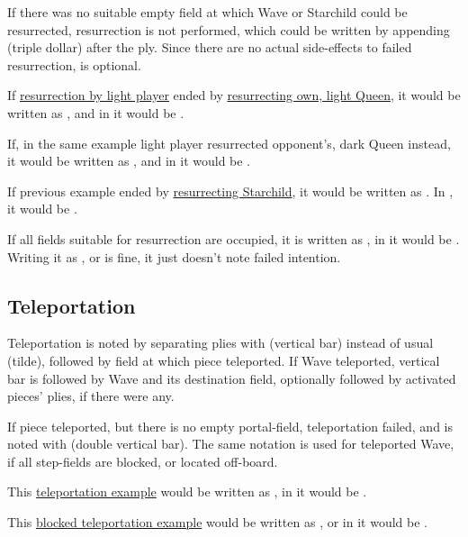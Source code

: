 If there was no suitable empty field at which Wave or Starchild could be resurrected,
resurrection is not performed, which could be written by appending \alg{\$\$\$} (triple
dollar) after the ply. Since there are no actual side-effects to failed resurrection,
\alg{\$\$\$} is optional.

If \hyperref[fig:scn_o_32_syzygy_starchild_init]{resurrection by light player} ended by
\hyperref[fig:scn_o_33_syzygy_starchild_end]{resurrecting own, light Queen}, it would be
written as , and in  it would be .

If, in the same example light player resurrected opponent's, dark Queen instead, it would
be written as , and in  it would be .

If previous example ended by
\hyperref[fig:scn_o_34_syzygy_starchild_resurrection]{resurrecting Starchild}, it would
be written as . In , it would be .

If all fields suitable for resurrection are occupied, it is written as ,
in  it would be . Writing it as , or 
is fine, it just doesn't note failed intention.

\vfill %

\subsection*{Teleportation}
\label{sec:Appendix/Notation/Teleportation}

Teleportation is noted by separating plies with \alg{|} (vertical bar) instead of usual
\alg{\~{}} (tilde), followed by field at which piece teleported. If Wave teleported, vertical
bar is followed by Wave and its destination field, optionally followed by activated pieces'
plies, if there were any.

If piece teleported, but there is no empty portal-field, teleportation failed, and is noted
with \alg{||} (double vertical bar). The same notation is used for teleported Wave, if all
step-fields are blocked, or located off-board.

This \hyperref[fig:scn_n_02_teleport_init]{teleportation example} would be written as
, in  it would be .

This \hyperref[fig:scn_n_03_teleport_move_2]{blocked teleportation example} would be written
as , or in  it would be .

